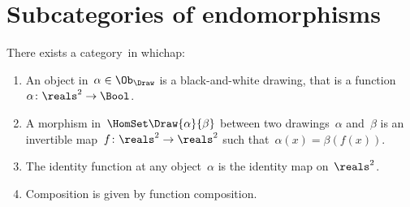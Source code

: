 
\section{Subcategories of endomorphisms}
\label{sec:Draw}


\index{\Draw}
\begin{definition}[Drawings]
    \label{def:Draw}
    There exists a category~\Draw in whichap:
    \begin{enumerate}
        \item An object in~$\alpha\in \Ob_\Draw$ is a black-and-white drawing,
              that is a function~$\alpha \colon \reals^2 \to \Bool$.
        \item A morphism in~$\HomSet\Draw{\alpha}{\beta}$ between two drawings~$\alpha$ and~$\beta$ is an invertible map~$f\colon \reals^2 \to \reals^2$ such that~$\alpha(x) = \beta(f(x))$.
        \item The identity function at any object~$\alpha$ is the identity map on~$\reals^2$.
        \item Composition is given by function composition.
    \end{enumerate}
\end{definition}

